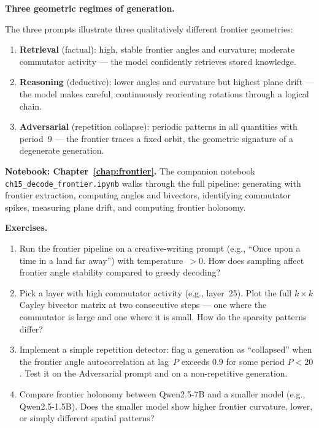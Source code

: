 \documentclass[11pt, twoside, openright]{memoir}
\numberwithin{equation}{chapter}
\begin{document}
\begin{keyidea}
\textbf{Three geometric regimes of generation.}

The three prompts illustrate three qualitatively different frontier
geometries:

\begin{enumerate}[nosep]
\item \textbf{Retrieval} (factual): high, stable frontier angles
  and curvature; moderate commutator activity --- the model
  confidently retrieves stored knowledge.
\item \textbf{Reasoning} (deductive): lower angles and curvature
  but highest plane drift --- the model makes careful, continuously
  reorienting rotations through a logical chain.
\item \textbf{Adversarial} (repetition collapse): periodic
  patterns in all quantities with period~9 --- the frontier traces
  a fixed orbit, the geometric signature of a degenerate
  generation.
\end{enumerate}
\end{keyidea}

\begin{tryit}
\textbf{Notebook: Chapter~\ref{chap:frontier}.}
The companion notebook
\texttt{ch15\_decode\_frontier.ipynb} walks through the full
pipeline: generating with frontier extraction, computing angles and
bivectors, identifying commutator spikes, measuring plane drift,
and computing frontier holonomy.

\medskip
\textbf{Exercises.}

\begin{enumerate}[nosep]
\item Run the frontier pipeline on a creative-writing prompt
  (e.g., ``Once upon a time in a land far away'') with
  temperature~$> 0$.  How does sampling affect frontier angle
  stability compared to greedy decoding?

\item Pick a layer with high commutator activity (e.g., layer~25).
  Plot the full $k \times k$ Cayley bivector matrix at two
  consecutive steps --- one where the commutator is large and one
  where it is small.  How do the sparsity patterns differ?

\item Implement a simple repetition detector: flag a generation as
  ``collapsed'' when the frontier angle autocorrelation at lag~$P$
  exceeds $0.9$ for some period $P < 20$.  Test it on the
  Adversarial prompt and on a non-repetitive generation.

\item Compare frontier holonomy between Qwen2.5-7B and a smaller
  model (e.g., Qwen2.5-1.5B).  Does the smaller model show
  higher frontier curvature, lower, or simply different spatial
  patterns?
\end{enumerate}
\end{tryit}
\end{document}
